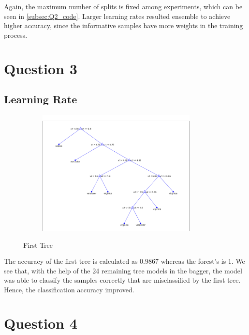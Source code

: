 \documentclass[11pt]{extarticle}
\begin{document}
Again, the maximum number of splits is fixed among experiments, which can be seen in \ref{subsec:Q2_code}. Larger learning rates resulted ensemble to achieve higher accuracy, since the informative samples have more weights in the training process.

\section{Question 3}
\subsection{Learning Rate}
\begin{figure}[h]
    \centering
    {\includegraphics[width = 4in, height = 2.5in]{Q3tree.png}}
    \caption{First Tree}
    \label{fig:q3_tr}
\end{figure}

The accuracy of the first tree is calculated as $0.9867$ whereas the forest's is 1. We see that, with the help of the 24 remaining tree models in the bagger, the model was able to classify the samples correctly that are misclassified by the first tree. Hence, the classification accuracy improved. 

\section{Question 4}
\end{document}
